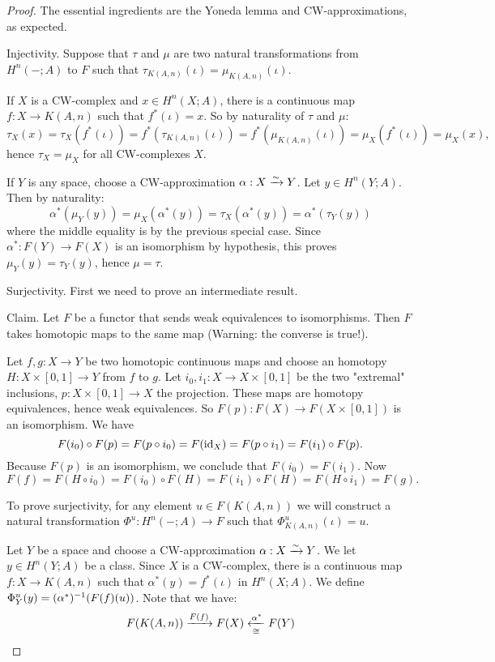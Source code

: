 \begin{proof}
The essential ingredients are the Yoneda lemma and CW-approximations, as expected.

Injectivity. Suppose that $\tau$ and $\mu$ are two natural transformations from $H^n(-;A)$ to $F$ such that $\tau_{K(A,n)}(\iota)=\mu_{K(A,n)}(\iota)$.

If $X$ is a CW-complex and $x\in H^n(X;A)$, there is a continuous map $f:X\to K(A,n)$ such that $f^*(\iota)=x$. So by naturality of $\tau$ and $\mu$:
\[\tau_X(x)=\tau_X(f^*(\iota))=f^*(\tau_{K(A,n)}(\iota))=f^*(\mu_{K(A,n)}(\iota))=\mu_X(f^*(\iota))=\mu_X(x),\]
hence $\tau_X=\mu_X$ for all CW-complexes $X$.

If $Y$ is any space, choose a CW-approximation $\alpha:X\xrightarrow{\sim} Y$. Let $y\in H^n(Y;A)$. Then by naturality:
\[\alpha^*(\mu_Y(y))=\mu_X(\alpha^*(y))=\tau_X(\alpha^*(y))=\alpha^*(\tau_Y(y))\]
where the middle equality is by the previous special case. Since $\alpha^*:F(Y)\to F(X)$ is an isomorphism by hypothesis, this proves $\mu_Y(y)=\tau_Y(y)$, hence $\mu=\tau$.

Surjectivity. First we need to prove an intermediate result.

Claim. Let $F$ be a functor that sends weak equivalences to isomorphisms. Then $F$ takes homotopic maps to the same map (Warning: the converse is  true!).

\begin{claimproof}
Let $f,g:X\to Y$ be two homotopic continuous maps and choose an homotopy $H:X\times[0,1]\to Y$ from $f$ to $g$. Let $i_0,i_1:X\to X\times[0,1]$ be the two "extremal" inclusions, $p:X\times[0,1]\to X$ the projection. These maps are homotopy equivalences, hence weak equivalences. So $F(p):F(X)\to F(X\times[0,1])$ is an isomorphism. We have
\[F(i_0)\circ F(p)=F(p\circ i_0)=F(\operatorname{id}_X)=F(p\circ i_1)=F(i_1)\circ F(p).\]
Because $F(p)$ is an isomorphism, we conclude that $F(i_0)=F(i_1)$. Now
\[F(f)=F(H\circ i_0)=F(i_0)\circ F(H)=F(i_1)\circ F(H)=F(H\circ i_1)=F(g).\]
\end{claimproof}

To prove surjectivity, for any element $u\in F(K(A,n))$ we will construct a natural transformation $\Phi^u:H^n(-;A)\to F$ such that $\Phi^u_{K(A,n)}(\iota)=u$.

Let $Y$ be a space and choose a CW-approximation $\alpha:X\xrightarrow{\sim}Y$. We let $y\in H^n(Y;A)$ be a class. Since $X$ is a CW-complex, there is a continuous map $f:X\to K(A,n)$ such that $\alpha^*(y)=f^*(\iota)$ in $H^n(X;A)$. We define $\Phi^u_Y(y)=(\alpha^*)^{-1}(F(f)(u))$. Note that we have:
\[F(K(A,n))\xrightarrow{F(f)}F(X)\underset{\cong}{\xleftarrow{\alpha^*}}F(Y)\]


\end{proof}
